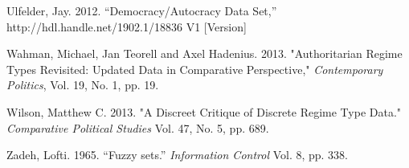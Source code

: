 \documentclass[letterpaper]{article}
\begin{document}
\begin{thebibliography}{1}
 Ulfelder, Jay. 2012. “Democracy/Autocracy Data Set,” http://hdl.handle.net/1902.1/18836 V1 [Version]

 Wahman, Michael, Jan Teorell and Axel Hadenius. 2013. "Authoritarian Regime Types Revisited: Updated Data in Comparative Perspective," \textit{Contemporary Politics}, Vol. 19, No. 1, pp. 19.

 Wilson, Matthew C. 2013. "A Discreet Critique of Discrete Regime Type Data." \textit{Comparative Political Studies} Vol. 47, No. 5, pp. 689.

 Zadeh, Lofti. 1965. “Fuzzy sets.” \textit{Information Control} Vol. 8, pp. 338.

\end{thebibliography}
\end{document}
